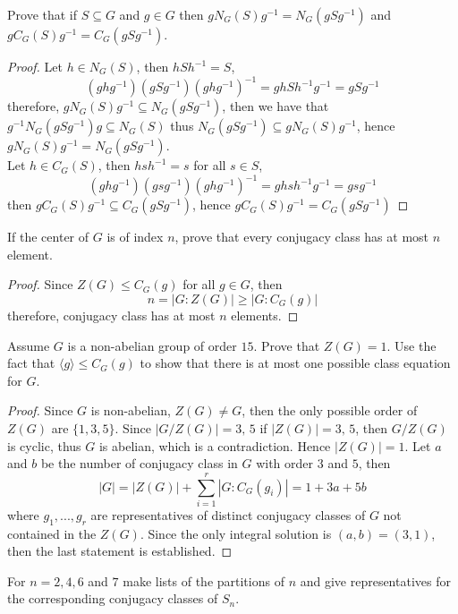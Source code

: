 \documentclass{article}
\newenvironment{problem}[2][Problem]{\begin{trivlist}
\item[\hskip \labelsep {\bfseries #1}\hskip \labelsep {\bfseries #2.}]}{\end{trivlist}}
\begin{document}
\begin{problem}{4}
    Prove that if $S\subseteq G$ and $g \in G$ then $g N_G(S)g^{-1}=N_G(gSg^{-1})$ and $g C_G(S)g^{-1}=C_G(gSg^{-1})$.
\end{problem}
\begin{proof}
    Let $h \in N_G(S)$, then $hSh^{-1}=S$, 
    \[
    (ghg^{-1})(gSg^{-1})(ghg^{-1})^{-1} 
    = ghSh^{-1}g^{-1} = gSg^{-1}
    \]
    therefore, $gN_G(S)g^{-1}\subseteq N_G(gSg^{-1})$, then we have that $g^{-1}N_G(gSg^{-1})g \subseteq N_G(S)$ thus $N_G(gSg^{-1}) \subseteq gN_G(S)g^{-1}$, hence $g N_G(S)g^{-1}=N_G(gSg^{-1})$. \\
    Let $h \in C_G(S)$, then $hsh^{-1}=s$ for all $s \in S$, 
    \[
        (ghg^{-1})(gsg^{-1})(ghg^{-1})^{-1} 
    = ghsh^{-1}g^{-1} = gsg^{-1}
    \]
    then $gC_G(S)g^{-1}\subseteq C_G(gSg^{-1})$, hence  $g C_G(S)g^{-1}=C_G(gSg^{-1})$
\end{proof}
\begin{problem}{5}
    If the center of $G$ is of index $n$, prove that every conjugacy class has at most $n$ element.
\end{problem}
\begin{proof}
    Since $Z(G)\leq C_G(g)$ for all $g \in G$, then 
    \[
    n=|G:Z(G)|\geq |G:C_G(g)|
    \]
    therefore, conjugacy class has at most $n$ elements.
\end{proof}
\begin{problem}{6}
    Assume $G$ is a non-abelian group of order $15$. Prove that $Z(G)=1$. Use the fact that $\langle g \rangle \leq C_G(g)$ to show that there is at most one possible class equation for $G$.
\end{problem}
\begin{proof}
    Since $G$ is non-abelian, $Z(G)\neq G$, then the only possible order of $Z(G)$ are $\{1, 3, 5\}$. Since $|G/Z(G)|=3, \, 5$ if $|Z(G)|=3, \, 5$, then $G/Z(G)$ is cyclic, thus $G$ is abelian, which is a contradiction. Hence $|Z(G)|=1$.
    Let $a$ and $b$ be the number of conjugacy class in $G$ with order $3$ and $5$, then
    \[
        |G|=|Z(G)|+\sum_{i=1}^r|G:C_G(g_i)|=1+3a+5b
    \]
    where $g_1, ..., g_r$ are representatives of distinct conjugacy classes of $G$ not contained in the $Z(G)$. Since the only integral solution is $(a, b)=(3, 1)$, then the last statement is established.
\end{proof}
\begin{problem}{7}
    For $n=2, 4, 6$ and $7$ make lists of the partitions of $n$ and give representatives for the corresponding conjugacy classes of $S_n$. 
\end{problem}
\end{document}
